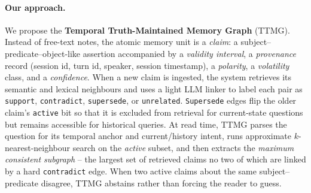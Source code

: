 \paragraph{Our approach.} We propose the \textbf{Temporal
Truth-Maintained Memory Graph} (TTMG). Instead of free-text notes, the
atomic memory unit is a \emph{claim}: a subject--predicate--object-like
assertion accompanied by a \emph{validity interval}, a
\emph{provenance} record (session id, turn id, speaker, session
timestamp), a \emph{polarity}, a \emph{volatility} class, and a
\emph{confidence}. When a new claim is ingested, the system retrieves
its semantic and lexical neighbours and uses a light LLM linker to
label each pair as \texttt{support}, \texttt{contradict},
\texttt{supersede}, or \texttt{unrelated}. \texttt{Supersede} edges
flip the older claim's \texttt{active} bit so that it is excluded from
retrieval for current-state questions but remains accessible for
historical queries. At read time, TTMG parses the question for its
temporal anchor and current/history intent, runs approximate
$k$-nearest-neighbour search on the \emph{active} subset, and then
extracts the \emph{maximum consistent subgraph} -- the largest set of
retrieved claims no two of which are linked by a hard
\texttt{contradict} edge. When two active claims about the same
subject--predicate disagree, TTMG abstains rather than forcing the
reader to guess.

